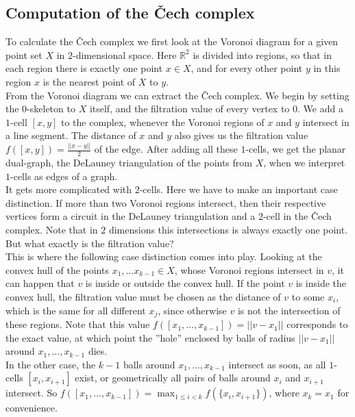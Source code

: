 \documentclass[11pt, a4paper, UKenglish]{article}
\newcommand{\bR}{\mathbb{R}}
\begin{document}
    \subsection{Computation of the Čech complex}\label{subsec:čech-complex}

    To calculate the Čech complex we first look at the Voronoi diagram for a given point set $X$ in $2$-dimensional space.
    Here $\bR^2$ is divided into regions, so that in each region there is exactly one point $x\in X$, and for every other point $y$ in this region $x$ is the nearest point of $X$ to $y$.\\
    From the Voronoi diagram we can extract the Čech complex.
    We begin by setting the $0$-skeleton to $X$ itself, and the filtration value of every vertex to $0$.
    We add a $1$-cell $[x,y]$ to the complex, whenever the Voronoi regions of $x$ and $y$ intersect in a line segment.
    The distance of $x$ and $y$ also gives us the filtration value $f([x,y]) = \frac{||x-y||}{2}$ of the edge.
    After adding all these $1$-cells, we get the planar dual-graph, the DeLauney triangulation of the points from $X$, when we interpret $1$-cells as edges of a graph.\\
    It gets more complicated with $2$-cells.
    Here we have to make an important case distinction.
    If more than two Voronoi regions intersect, then their respective vertices form a circuit in the DeLauney triangulation and a $2$-cell in the Čech complex.
    Note that in $2$ dimensions this intersections is always exactly one point.
    But what exactly is the filtration value?\\
    This is where the following case distinction comes into play.
    Looking at the convex hull of the points $x_1,\ldots x_{k-1}\in X$, whose Voronoi regions intersect in $v$, it can happen that $v$ is inside or outside the convex hull.
    If the point $v$ is inside the convex hull, the filtration value must be chosen as the distance of $v$ to some $x_i$, which is the same for all different $x_j$, since otherwise $v$ is not the intersection of these regions.
    Note that this value $f([x_1,\ldots,x_{k-1}])=||v-x_1||$ corresponds to the exact value, at which point the ''hole'' enclosed by balls of radius $||v-x_1||$ around $x_1,\ldots,x_{k-1}$ dies.\\
    
    In the other case, the $k-1$ balls around $x_1,\ldots,x_{k-1}$ intersect as soon, as all $1$-cells $[x_i,x_{i+1}]$ exist, or geometrically all pairs of balls around $x_i$ and $x_{i+1}$ intersect.
    So $f([x_1,\ldots,x_{k-1}])=\max_{1\leq i<k} f(\{x_i,x_{i+1}\})$, where $x_k=x_1$ for convenience.
\end{document}
